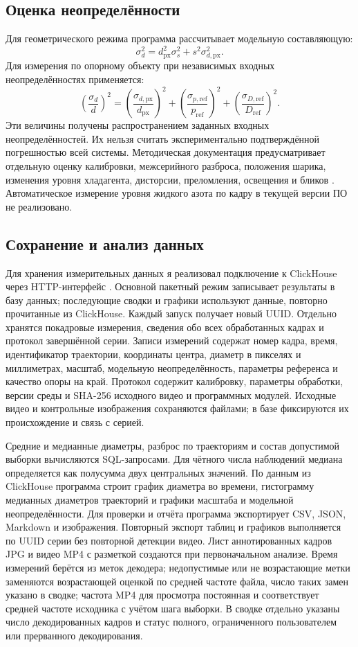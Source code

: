 \documentclass[12pt,a4paper]{article}
\begin{document}
\subsection{Оценка неопределённости}
Для геометрического режима программа рассчитывает модельную составляющую:
\[
\sigma_d^2=d_{\mathrm{px}}^2\sigma_s^2+s^2\sigma_{d,\mathrm{px}}^2.
\]
Для измерения по опорному объекту при независимых входных неопределённостях применяется:
\[
\left(\frac{\sigma_d}{d}\right)^2=
\left(\frac{\sigma_{d,\mathrm{px}}}{d_{\mathrm{px}}}\right)^2+
\left(\frac{\sigma_{p,\mathrm{ref}}}{p_{\mathrm{ref}}}\right)^2+
\left(\frac{\sigma_{D,\mathrm{ref}}}{D_{\mathrm{ref}}}\right)^2.
\]
Эти величины получены распространением заданных входных неопределённостей. Их нельзя считать экспериментально подтверждённой погрешностью всей системы. Методическая документация предусматривает отдельную оценку калибровки, межсерийного разброса, положения шарика, изменения уровня хладагента, дисторсии, преломления, освещения и бликов \cite{docs}. Автоматическое измерение уровня жидкого азота по кадру в текущей версии ПО не реализовано.

\subsection{Сохранение и анализ данных}
Для хранения измерительных данных я реализовал подключение к ClickHouse через HTTP-интерфейс \cite{clickhouse,code}. Основной пакетный режим записывает результаты в базу данных; последующие сводки и графики используют данные, повторно прочитанные из ClickHouse. Каждый запуск получает новый UUID. Отдельно хранятся покадровые измерения, сведения обо всех обработанных кадрах и протокол завершённой серии. Записи измерений содержат номер кадра, время, идентификатор траектории, координаты центра, диаметр в пикселях и миллиметрах, масштаб, модельную неопределённость, параметры референса и качество опоры на край. Протокол содержит калибровку, параметры обработки, версии среды и SHA-256 исходного видео и программных модулей. Исходные видео и контрольные изображения сохраняются файлами; в базе фиксируются их происхождение и связь с серией.

Средние и медианные диаметры, разброс по траекториям и состав допустимой выборки вычисляются SQL-запросами. Для чётного числа наблюдений медиана определяется как полусумма двух центральных значений. По данным из ClickHouse программа строит график диаметра во времени, гистограмму медианных диаметров траекторий и графики масштаба и модельной неопределённости. Для проверки и отчёта программа экспортирует CSV, JSON, Markdown и изображения. Повторный экспорт таблиц и графиков выполняется по UUID серии без повторной детекции видео. Лист аннотированных кадров JPG и видео MP4 с разметкой создаются при первоначальном анализе. Время измерений берётся из меток декодера; недопустимые или не возрастающие метки заменяются возрастающей оценкой по средней частоте файла, число таких замен указано в сводке; частота MP4 для просмотра постоянная и соответствует средней частоте исходника с учётом шага выборки. В сводке отдельно указаны число декодированных кадров и статус полного, ограниченного пользователем или прерванного декодирования.
\end{document}
